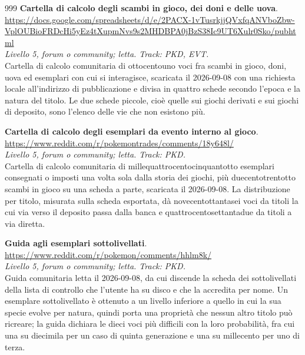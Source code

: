 \begin{thebibliography}{999}
  \textbf{Cartella di calcolo degli scambi in gioco, dei doni e delle uova}.
  \\ \url{https://docs.google.com/spreadsheets/d/e/2PACX-1vTusrkjjQVxfqANVboZbw-VplOUBioFRDcHi5yEz4tXupmNvs9s2MHDBPA0jBzS38Ic9UT6Xulr0Sko/pubhtml}
  \\ \emph{Livello 5, forum o community; letta. Track: PKD, EVT.}
  \\ Cartella di calcolo comunitaria di ottocentouno voci fra scambi in gioco, doni, uova ed esemplari con cui si interagisce, scaricata il 2026-09-08 con una richiesta locale all'indirizzo di pubblicazione e divisa in quattro schede secondo l'epoca e la natura del titolo. Le due schede piccole, cioè quelle sui giochi derivati e sui giochi di deposito, sono l'elenco delle vie che non esistono più.

  \textbf{Cartella di calcolo degli esemplari da evento interno al gioco}.
  \\ \url{https://www.reddit.com/r/pokemontrades/comments/18y648l/}
  \\ \emph{Livello 5, forum o community; letta. Track: PKD.}
  \\ Cartella di calcolo comunitaria di millequattrocentocinquantotto esemplari consegnati o imposti una volta sola dalla storia dei giochi, più duecentotrentotto scambi in gioco su una scheda a parte, scaricata il 2026-09-08. La distribuzione per titolo, misurata sulla scheda esportata, dà novecentottantasei voci da titoli la cui via verso il deposito passa dalla banca e quattrocentosettantadue da titoli a via diretta.

  \textbf{Guida agli esemplari sottolivellati}.
  \\ \url{https://www.reddit.com/r/pokemon/comments/hhlm8k/}
  \\ \emph{Livello 5, forum o community; letta. Track: PKD.}
  \\ Guida comunitaria letta il 2026-09-08, da cui discende la scheda dei sottolivellati della lista di controllo che l'utente ha su disco e che la accredita per nome. Un esemplare sottolivellato è ottenuto a un livello inferiore a quello in cui la sua specie evolve per natura, quindi porta una proprietà che nessun altro titolo può ricreare; la guida dichiara le dieci voci più difficili con la loro probabilità, fra cui una su diecimila per un caso di quinta generazione e una su millecento per uno di terza.


\end{thebibliography}
